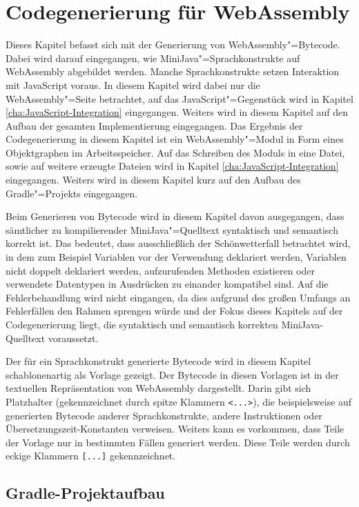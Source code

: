 \chapter{Codegenerierung für WebAssembly}
\label{cha:Codegenerierung-für-WebAssembly}

Dieses Kapitel befasst sich mit der Generierung von WebAssembly"=Bytecode. Dabei wird darauf eingegangen, wie MiniJava"=Sprachkonstrukte auf WebAssembly abgebildet werden. Manche Sprachkonstrukte setzen Interaktion mit JavaScript voraus. In diesem Kapitel wird dabei nur die WebAssembly"=Seite betrachtet, auf das JavaScript"=Gegenstück wird in Kapitel \ref{cha:JavaScript-Integration} eingegangen. Weiters wird in diesem Kapitel auf den Aufbau der gesamten Implementierung eingegangen. Das Ergebnis der Codegenerierung in diesem Kapitel ist ein WebAssembly"=Modul in Form eines Objektgraphen im Arbeitsspeicher. Auf das Schreiben des Moduls in eine Datei, sowie auf weitere erzeugte Dateien wird in Kapitel \ref{cha:JavaScript-Integration} eingegangen. Weiters wird in diesem Kapitel kurz auf den Aufbau des Gradle"=Projekts eingegangen.

Beim Generieren von Bytecode wird in diesem Kapitel davon ausgegangen, dass sämtlicher zu kompilierender MiniJava"=Quelltext syntaktisch und semantisch korrekt ist. Das bedeutet, dass ausschließlich der Schönwetterfall betrachtet wird, in dem zum Beispiel Variablen vor der Verwendung deklariert werden, Variablen nicht doppelt deklariert werden, aufzurufenden Methoden existieren oder verwendete Datentypen in Ausdrücken zu einander kompatibel sind. Auf die Fehlerbehandlung wird nicht eingangen, da dies aufgrund des großen Umfangs an Fehlerfällen den Rahmen sprengen würde und der Fokus dieses Kapitels auf der Codegenerierung liegt, die syntaktisch und semantisch korrekten MiniJava-Quelltext voraussetzt.

Der für ein Sprachkonstrukt generierte Bytecode wird in diesem Kapitel schablonenartig als Vorlage gezeigt. Der Bytecode in diesen Vorlagen ist in der textuellen Repräsentation von WebAssembly dargestellt. Darin gibt sich Platzhalter (gekennzeichnet durch spitze Klammern \lstinline{<...>}), die beispielsweise auf generierten Bytecode anderer Sprachkonstrukte, andere Instruktionen oder Übersetzungszeit-Konstanten verweisen. Weiters kann es vorkommen, dass Teile der Vorlage nur in bestimmten Fällen generiert werden. Diese Teile werden durch eckige Klammern \lstinline{[...]} gekennzeichnet.

\pagebreak
\section{Gradle-Projektaufbau}

